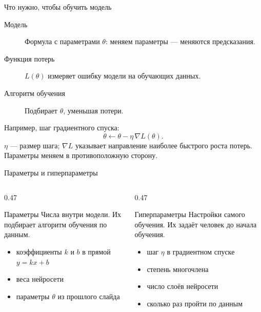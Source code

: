 \begin{frame}{Что нужно, чтобы обучить модель}
  \begin{description}
    \item[Модель] Формула с параметрами $\theta$: меняем параметры --- меняются предсказания.
    \item[Функция потерь] $L(\theta)$ измеряет ошибку модели на обучающих данных.
    \item[Алгоритм обучения] Подбирает $\theta$, уменьшая потери.
  \end{description}
  Например, шаг градиентного спуска:
  \[
    \theta \leftarrow \theta-\eta\,\nabla L(\theta).
  \]
  $\eta$ --- размер шага; $\nabla L$ указывает направление наиболее быстрого роста потерь.
  Параметры меняем в противоположную сторону.
\end{frame}

\begin{frame}[c]{Параметры и гиперпараметры}
  \begin{columns}[T]
    \begin{column}{0.47\textwidth}
      \begin{block}{Параметры}
        Числа внутри модели. Их подбирает алгоритм обучения по данным.
        \begin{itemize}
          \item коэффициенты $k$ и $b$ в прямой $y=kx+b$
          \item веса нейросети
          \item параметры $\theta$ из прошлого слайда
        \end{itemize}
      \end{block}
    \end{column}
    \begin{column}{0.47\textwidth}
      \begin{block}{Гиперпараметры}
        Настройки самого обучения. Их задаёт человек до начала обучения.
        \begin{itemize}
          \item шаг $\eta$ в градиентном спуске
          \item степень многочлена
          \item число слоёв нейросети
          \item сколько раз пройти по данным
        \end{itemize}
      \end{block}
    \end{column}
  \end{columns}
\end{frame}

